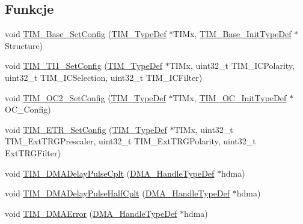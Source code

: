 \subsection*{Funkcje}
\begin{DoxyCompactItemize}
\item 
void \hyperlink{group___t_i_m___private___functions_ga057e4b4da135186e8fb88327c5fd0684}{T\+I\+M\+\_\+\+Base\+\_\+\+Set\+Config} (\hyperlink{struct_t_i_m___type_def}{T\+I\+M\+\_\+\+Type\+Def} $\ast$T\+I\+Mx, \hyperlink{struct_t_i_m___base___init_type_def}{T\+I\+M\+\_\+\+Base\+\_\+\+Init\+Type\+Def} $\ast$Structure)
\item 
void \hyperlink{group___t_i_m___private___functions_ga83c847710a92f0558c862dd0dc889ff3}{T\+I\+M\+\_\+\+T\+I1\+\_\+\+Set\+Config} (\hyperlink{struct_t_i_m___type_def}{T\+I\+M\+\_\+\+Type\+Def} $\ast$T\+I\+Mx, uint32\+\_\+t T\+I\+M\+\_\+\+I\+C\+Polarity, uint32\+\_\+t T\+I\+M\+\_\+\+I\+C\+Selection, uint32\+\_\+t T\+I\+M\+\_\+\+I\+C\+Filter)
\item 
void \hyperlink{group___t_i_m___private___functions_ga20370137a5c000fa4739d30669e67b8c}{T\+I\+M\+\_\+\+O\+C2\+\_\+\+Set\+Config} (\hyperlink{struct_t_i_m___type_def}{T\+I\+M\+\_\+\+Type\+Def} $\ast$T\+I\+Mx, \hyperlink{struct_t_i_m___o_c___init_type_def}{T\+I\+M\+\_\+\+O\+C\+\_\+\+Init\+Type\+Def} $\ast$O\+C\+\_\+\+Config)
\item 
void \hyperlink{group___t_i_m___private___functions_ga0dc6b90093e2510142a5b21d75e025e0}{T\+I\+M\+\_\+\+E\+T\+R\+\_\+\+Set\+Config} (\hyperlink{struct_t_i_m___type_def}{T\+I\+M\+\_\+\+Type\+Def} $\ast$T\+I\+Mx, uint32\+\_\+t T\+I\+M\+\_\+\+Ext\+T\+R\+G\+Prescaler, uint32\+\_\+t T\+I\+M\+\_\+\+Ext\+T\+R\+G\+Polarity, uint32\+\_\+t Ext\+T\+R\+G\+Filter)
\item 
void \hyperlink{group___t_i_m___private___functions_ga78edd2f05a873d68690d8658aa427ccf}{T\+I\+M\+\_\+\+D\+M\+A\+Delay\+Pulse\+Cplt} (\hyperlink{group___d_m_a___exported___types_ga41b754a906b86bce54dc79938970138b}{D\+M\+A\+\_\+\+Handle\+Type\+Def} $\ast$hdma)
\item 
void \hyperlink{group___t_i_m___private___functions_ga8bfc333f26980f4e473a75cdb45de292}{T\+I\+M\+\_\+\+D\+M\+A\+Delay\+Pulse\+Half\+Cplt} (\hyperlink{group___d_m_a___exported___types_ga41b754a906b86bce54dc79938970138b}{D\+M\+A\+\_\+\+Handle\+Type\+Def} $\ast$hdma)
\item 
void \hyperlink{group___t_i_m___private___functions_gaa112bee5279feee040c1ea9e283f7378}{T\+I\+M\+\_\+\+D\+M\+A\+Error} (\hyperlink{group___d_m_a___exported___types_ga41b754a906b86bce54dc79938970138b}{D\+M\+A\+\_\+\+Handle\+Type\+Def} $\ast$hdma)

\end{DoxyCompactItemize}
